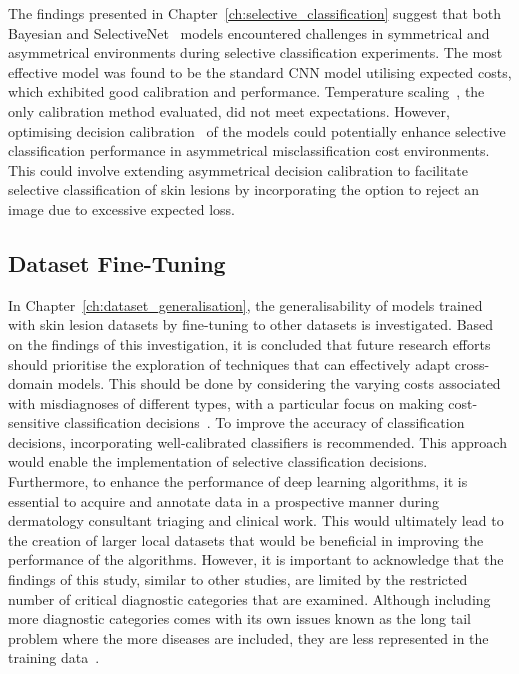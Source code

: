 The findings presented in Chapter~\ref{ch:selective_classification} suggest that both Bayesian and SelectiveNet~\citep{geifman2019selectivenet} models encountered challenges in symmetrical and asymmetrical environments during selective classification experiments. The most effective model was found to be the standard CNN model utilising expected costs, which exhibited good calibration and performance. Temperature scaling~\citep{guo2017calibration}, the only calibration method evaluated, did not meet expectations. However, optimising decision calibration~\citep{zhao2021calibrating} of the models could potentially enhance selective classification performance in asymmetrical misclassification cost environments. This could involve extending asymmetrical decision calibration to facilitate selective classification of skin lesions by incorporating the option to reject an image due to excessive expected loss.

\subsection{Dataset Fine-Tuning}
In Chapter~\ref{ch:dataset_generalisation}, the generalisability of models trained with skin lesion datasets by fine-tuning to other datasets is investigated. Based on the findings of this investigation, it is concluded that future research efforts should prioritise the exploration of techniques that can effectively adapt cross-domain models. This should be done by considering the varying costs associated with misdiagnoses of different types, with a particular focus on making cost-sensitive classification decisions~\citep{guan2021domain,carse2021robust}. To improve the accuracy of classification decisions, incorporating well-calibrated classifiers is recommended. This approach would enable the implementation of selective classification decisions. Furthermore, to enhance the performance of deep learning algorithms, it is essential to acquire and annotate data in a prospective manner during dermatology consultant triaging and clinical work. This would ultimately lead to the creation of larger local datasets that would be beneficial in improving the performance of the algorithms. However, it is important to acknowledge that the findings of this study, similar to other studies, are limited by the restricted number of critical diagnostic categories that are examined. Although including more diagnostic categories comes with its own issues known as the long tail problem where the more diseases are included, they are less represented in the training data~\citep{roy2022does}.